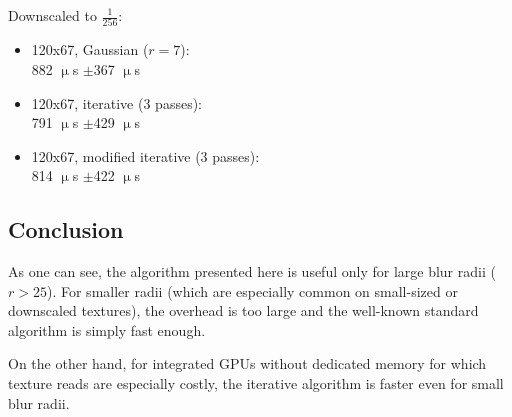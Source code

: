 \documentclass[english,fleqn,10pt,twocolumn]{article}
\begin{document}
Downscaled to $\frac 1{256}$:
\begin{itemize}
    \item 120x67, Gaussian ($r = 7$): \\
        882 $\upmu$s $\pm$367 $\upmu$s
    \item 120x67, iterative (3 passes): \\
        791 $\upmu$s $\pm$429 $\upmu$s
    \item 120x67, modified iterative (3 passes): \\
        814 $\upmu$s $\pm$422 $\upmu$s
\end{itemize}

\subsection{Conclusion}

As one can see, the algorithm presented here is useful only for large blur radii ($r > 25$). For smaller radii (which are especially common on small-sized or downscaled textures), the overhead is too
large and the well-known standard algorithm is simply fast enough.

On the other hand, for integrated GPUs without dedicated memory for which texture reads are especially costly, the iterative algorithm is faster even for small blur radii.
\end{document}
